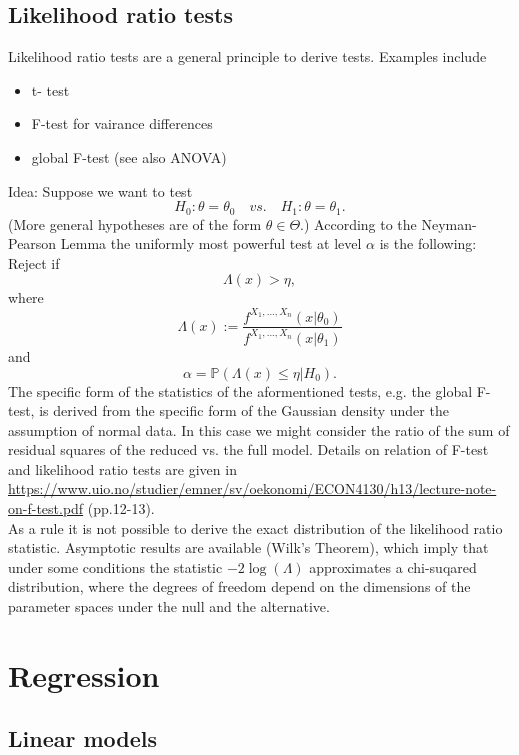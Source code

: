 \documentclass[12pt,a4paper]{amsart}
\theoremstyle{definition}
\theoremstyle{remark}
\numberwithin{equation}{section}
\begin{document}
\subsection{Likelihood ratio tests} %

Likelihood ratio tests are a general principle to derive tests. Examples include

\begin{itemize}
\item t- test
\item F-test for vairance differences
\item global F-test (see also ANOVA)
\end{itemize}

Idea: Suppose we want to test
$$H_0: \theta=\theta_0 \quad vs. \quad H_1: \theta = \theta_1.$$
(More general hypotheses are of the form $\theta \in \Theta$.) According to the Neyman-Pearson Lemma the uniformly most powerful test at level $\alpha$ is the following: Reject if
$$\Lambda(x)>\eta,$$
where 
$$\Lambda(x):= \frac{f^{X_1,...,X_n}(x| \theta_0)}{f^{X_1,...,X_n}(x| \theta_1)}$$
and 
$$ \alpha= \mathbb{P}(\Lambda(x)\le \eta | H_0).$$
 The specific form of the statistics of the aformentioned tests, e.g. the global F-test, is derived from the specific form of the Gaussian density under the assumption of normal data. In this case we might consider the ratio of the sum of residual squares of the reduced vs. the full model. Details on relation of F-test and likelihood ratio tests are given in \url{https://www.uio.no/studier/emner/sv/oekonomi/ECON4130/h13/lecture-note-on-f-test.pdf} (pp.12-13).\\

As a rule it is not possible to derive the exact distribution of the likelihood ratio statistic. Asymptotic results are available (Wilk's Theorem), which imply that under some conditions the statistic $-2 \log(\Lambda)$ approximates a chi-suqared distribution, where the degrees of freedom depend on the dimensions of the parameter spaces under the null and the alternative.


\section{Regression}

\subsection{Linear models}
\end{document}
